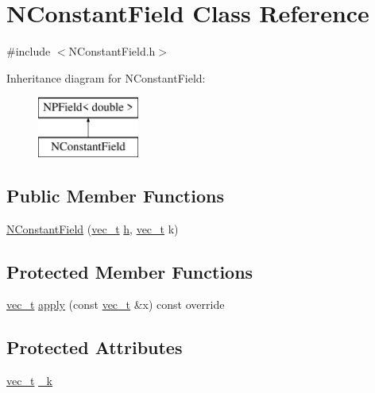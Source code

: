 \hypertarget{class_n_constant_field}{}\section{N\+Constant\+Field Class Reference}
\label{class_n_constant_field}


{\ttfamily \#include $<$N\+Constant\+Field.\+h$>$}

Inheritance diagram for N\+Constant\+Field\+:\begin{figure}[H]
\begin{center}
\leavevmode
\includegraphics[height=2.000000cm]{class_n_constant_field}
\end{center}
\end{figure}
\subsection*{Public Member Functions}
\begin{DoxyCompactItemize}
\item 
\mbox{\hyperlink{class_n_constant_field_a0bf33435d6fb4f605c1c85cf0d9ff770}{N\+Constant\+Field}} (\mbox{\hyperlink{group___n_algebra_ga0a2cfc67e738a3d73e4f12098c4c07f6}{vec\+\_\+t}} \mbox{\hyperlink{class_n_p_field_a21a56864db47d8589ec917764e3b2b85}{h}}, \mbox{\hyperlink{group___n_algebra_ga0a2cfc67e738a3d73e4f12098c4c07f6}{vec\+\_\+t}} k)
\end{DoxyCompactItemize}
\subsection*{Protected Member Functions}
\begin{DoxyCompactItemize}
\item 
\mbox{\hyperlink{group___n_algebra_ga0a2cfc67e738a3d73e4f12098c4c07f6}{vec\+\_\+t}} \mbox{\hyperlink{class_n_constant_field_a2b81a6a4f9fa56580002d180ac769c9b}{apply}} (const \mbox{\hyperlink{group___n_algebra_ga0a2cfc67e738a3d73e4f12098c4c07f6}{vec\+\_\+t}} \&x) const override
\end{DoxyCompactItemize}
\subsection*{Protected Attributes}
\begin{DoxyCompactItemize}
\item 
\mbox{\hyperlink{group___n_algebra_ga0a2cfc67e738a3d73e4f12098c4c07f6}{vec\+\_\+t}} \mbox{\hyperlink{class_n_constant_field_adc7caf84cc8e117807c19c95cb47d1bc}{\+\_\+k}}
\end{DoxyCompactItemize}
